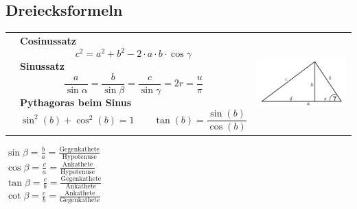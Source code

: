 \subsection{Dreiecksformeln}
\begin{tabular}{lll}
	& \parbox{9.5cm}{
		\textbf{Cosinussatz} 
		\[
			c^2 = a^2 + b^2 - 2 \cdot a \cdot b \cdot \cos \gamma
		\]	
		\textbf{Sinussatz}
		\[
		\frac{a}{\sin \alpha} = \frac{b}{\sin \beta} = \frac{c}{\sin \gamma} = 2r = \frac{u}{\pi}
		\]
		\textbf{Pythagoras beim Sinus}
		\[
			\sin^2(b)+\cos^2(b)=1 \qquad \tan(b)=\frac{\sin(b)}{\cos(b)}
		\]
		}		
	& \parbox{8cm}{
		\includegraphics[width=6cm]{./idiotenseite/images/cosinussatz.png}}
\end{tabular}
\begin{center}
	\begin{multicols}{2}
		$\sin \beta = \frac ba =\frac{\text{Gegenkathete}}{\text{Hypotenuse}}$\\
		$\cos \beta = \frac ca =\frac{\text{Ankathete}}{\text{Hypotenuse}}$\\
		$\tan \beta = \frac cb =\frac{\text{Gegenkathete}}{\text{Ankathete}}$\\
		$\cot \beta = \frac cb =\frac{\text{Ankathete}}{\text{Gegenkathete}}$\\
	\end{multicols}
\end{center}

	